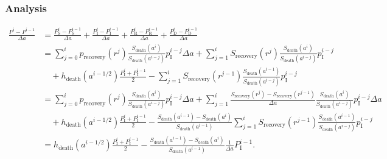\documentclass[12pt]{article}
\begin{document}
\subsubsection{Analysis}

\begin{equation}
  \begin{split}
    \frac{P^i - P^{i - 1}}{\Delta a}
    &=
    \frac{P_{\mathrm{S}}^i - P_{\mathrm{S}}^{i - 1}}{\Delta a}
    +
    \frac{P_{\mathrm{I}}^i - P_{\mathrm{I}}^{i - 1}}{\Delta a}
    +
    \frac{P_{\mathrm{R}}^i - P_{\mathrm{R}}^{i - 1}}{\Delta a}
    +
    \frac{P_{\mathrm{D}}^i - P_{\mathrm{D}}^{i - 1}}{\Delta a}
    \\
    &=
    \sum_{j = 0}^i
    p_{\text{recovery}}(r^j)
    \frac{S_{\text{death}}(a^i)}{S_{\text{death}}(a^{i - j})}
    p_{\mathrm{I}}^{i - j}
    \Delta a
    + \sum_{j = 1}^i S_{\text{recovery}}(r^j)
    \frac{S_{\text{death}}(a^i)}{S_{\text{death}}(a^{i - j})}
    p_{\mathrm{I}}^{i - j}
    \\ & \quad {}
    + h_{\text{death}}(a^{i - 1 / 2})
    \frac{P_{\mathrm{I}}^i + P_{\mathrm{I}}^{i - 1}}{2}
    - \sum_{j = 1}^i S_{\text{recovery}}(r^{j - 1})
    \frac{S_{\text{death}}(a^{i - 1})}{S_{\text{death}}(a^{i - j})}
    p_{\mathrm{I}}^{i - j}
    \\
    &=
    \sum_{j = 0}^i
    p_{\text{recovery}}(r^j)
    \frac{S_{\text{death}}(a^i)}{S_{\text{death}}(a^{i - j})}
    p_{\mathrm{I}}^{i - j}
    \Delta a
    +
    \sum_{j = 1}^i
    \frac{S_{\text{recovery}}(r^j) - S_{\text{recovery}}(r^{j - 1})}
    {\Delta a}
    \frac{S_{\text{death}}(a^i)}{S_{\text{death}}(a^{i - j})}
    p_{\mathrm{I}}^{i - j} \Delta a
    \\ & \quad {}
    + h_{\text{death}}(a^{i - 1 / 2})
    \frac{P_{\mathrm{I}}^i + P_{\mathrm{I}}^{i - 1}}{2}
    - \frac{S_{\text{death}}(a^{i - 1}) - S_{\text{death}}(a^i)}
    {S_{\text{death}}(a^{i - 1})}
    \sum_{j = 1}^i
    S_{\text{recovery}}(r^{j - 1})
    \frac{S_{\text{death}}(a^{i - 1})}{S_{\text{death}}(a^{i - j})}
    p_{\mathrm{I}}^{i - j}
    \\
    &=
    h_{\text{death}}(a^{i - 1 / 2})
    \frac{P_{\mathrm{I}}^i + P_{\mathrm{I}}^{i - 1}}{2}
    - \frac{S_{\text{death}}(a^{i - 1}) - S_{\text{death}}(a^i)}
    {S_{\text{death}}(a^{i - 1})}
    \frac{1}{\Delta a} P_{\mathrm{I}}^{i - 1}.
  \end{split}
\end{equation}
\end{document}
